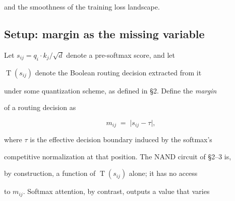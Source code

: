 \documentclass[11pt]{article}
\theoremstyle{definition}
\newcommand{\threshold}{\operatorname{T}}
\begin{document}
and the smoothness of the training loss landscape.











\subsection{Setup: margin as the missing variable}











Let $s_{ij} = q_i \cdot k_j / \sqrt{d}$ denote a pre-softmax score, and let





$\threshold(s_{ij})$ denote the Boolean routing decision extracted from it





under some quantization scheme, as defined in \S2. Define the \emph{margin}





of a routing decision as





\[





  m_{ij} \;=\; \bigl| s_{ij} - \tau \bigr|,





\]





where $\tau$ is the effective decision boundary induced by the softmax's





competitive normalization at that position. The NAND circuit of \S2--3 is,





by construction, a function of $\threshold(s_{ij})$ alone; it has no access





to $m_{ij}$. Softmax attention, by contrast, outputs a value that varies
\end{document}
